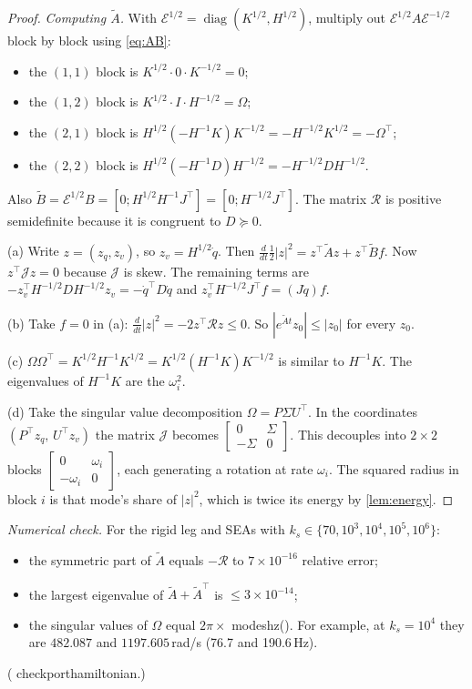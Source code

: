 \documentclass[11pt]{article}
\theoremstyle{definition}
\theoremstyle{remark}
\newcommand{\diag}{\operatorname{diag}}
\newcommand{\Em}{\mathcal{E}}         %
\newcommand{\At}{\tilde{A}}
\newcommand{\Jt}{\mathcal{J}}
\newcommand{\Rt}{\mathcal{R}}
\newcommand{\codeus}{\textunderscore\allowbreak}
\newcommand{\code}[1]{{\ttfamily\let\_\codeus\hyphenchar\font=-1 #1}}
\newcommand{\checked}[1]{\par\smallskip\noindent\textit{Numerical check.} #1\par}
\begin{document}
\begin{proof}
\emph{Computing $\At$.} With $\Em^{1/2}=\diag(K^{1/2},H^{1/2})$, multiply out
$\Em^{1/2}A\Em^{-1/2}$ block by block using \eqref{eq:AB}:
\begin{itemize}[nosep]
  \item the $(1,1)$ block is $K^{1/2}\cdot0\cdot K^{-1/2}=0$;
  \item the $(1,2)$ block is $K^{1/2}\cdot I\cdot H^{-1/2}=\Omega$;
  \item the $(2,1)$ block is
        $H^{1/2}(-H^{-1}K)K^{-1/2}=-H^{-1/2}K^{1/2}=-\Omega^\top$;
  \item the $(2,2)$ block is $H^{1/2}(-H^{-1}D)H^{-1/2}=-H^{-1/2}DH^{-1/2}$.
\end{itemize}
Also $\tilde B=\Em^{1/2}B=[0;H^{1/2}H^{-1}J^\top]=[0;H^{-1/2}J^\top]$. The matrix
$\Rt$ is positive semidefinite because it is congruent to $D\succeq0$.

(a) Write $z=(z_q,z_v)$, so $z_v=H^{1/2}\dot q$. Then
$\frac{d}{dt}\frac12|z|^2=z^\top\At z+z^\top\tilde Bf$. Now $z^\top\Jt z=0$ because
$\Jt$ is skew. The remaining terms are $-z_v^\top H^{-1/2}DH^{-1/2}z_v=-\dot q^\top
D\dot q$ and $z_v^\top H^{-1/2}J^\top f=(J\dot q)f$.

(b) Take $f=0$ in (a): $\frac{d}{dt}|z|^2=-2z^\top\Rt z\le0$. So $|e^{\At t}z_0|\le|z_0|$
for every $z_0$.

(c) $\Omega\Omega^\top=K^{1/2}H^{-1}K^{1/2}=K^{1/2}(H^{-1}K)K^{-1/2}$ is similar to
$H^{-1}K$. The eigenvalues of $H^{-1}K$ are the $\omega_i^2$.

(d) Take the singular value decomposition $\Omega=P\Sigma U^\top$. In the coordinates
$(P^\top z_q,\,U^\top z_v)$ the matrix $\Jt$ becomes $\begin{bmatrix}0&\Sigma\\-\Sigma&0
\end{bmatrix}$. This decouples into $2\times2$ blocks
$\begin{bmatrix}0&\omega_i\\-\omega_i&0\end{bmatrix}$, each generating a rotation at
rate $\omega_i$. The squared radius in block $i$ is that mode's share of $|z|^2$, which is
twice its energy by \cref{lem:energy}.
\end{proof}

\checked{For the rigid leg and SEAs with $k_s\in\{70,10^3,10^4,10^5,10^6\}$:
\begin{itemize}[nosep]
  \item the symmetric part of $\At$ equals $-\Rt$ to $7\times10^{-16}$ relative error;
  \item the largest eigenvalue of $\At+\At^\top$ is $\le 3\times10^{-14}$;
  \item the singular values of $\Omega$ equal $2\pi\times$\code{modes\_hz()}. For example,
        at $k_s=10^4$ they are $482.087$ and $1197.605$\,rad/s (76.7 and 190.6\,Hz).
\end{itemize}
(\code{check\_port\_hamiltonian}.)}
\end{document}
